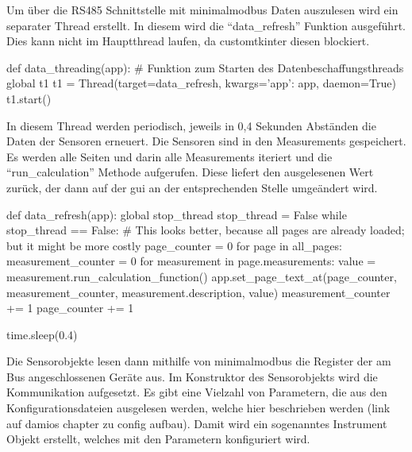 Um über die RS485 Schnittstelle mit minimalmodbus Daten auszulesen wird ein separater Thread erstellt. In diesem wird die \enquote{data\_refresh} Funktion ausgeführt. Dies kann nicht im Hauptthread laufen, da customtkinter diesen blockiert.

\begin{pythoncode}
def data_threading(app):
	# Funktion zum Starten des Datenbeschaffungsthreads
	global t1
	t1 = Thread(target=data_refresh, kwargs={'app': app}, daemon=True)
	t1.start()
\end{pythoncode}

In diesem Thread werden periodisch, jeweils in 0,4 Sekunden Abständen die Daten der Sensoren erneuert. Die Sensoren sind in den Measurements gespeichert. Es werden alle Seiten und darin alle Measurements iteriert und die \enquote{run\_calculation} Methode aufgerufen. Diese liefert den ausgelesenen Wert zurück, der dann auf der \acs{gui} an der entsprechenden Stelle umgeändert wird.

\begin{pythoncode}
def data_refresh(app):
	global stop_thread
	stop_thread = False
	while stop_thread == False:
		# This looks better, because all pages are already loaded; but it might be more costly
		page_counter = 0
		for page in all_pages:
			measurement_counter = 0
			for measurement in page.measurements:
				value = measurement.run_calculation_function()
				app.set_page_text_at(page_counter, measurement_counter, measurement.description, value)
				measurement_counter += 1
			page_counter += 1
		
		time.sleep(0.4)
\end{pythoncode}

Die Sensorobjekte lesen dann mithilfe von minimalmodbus die Register der am Bus angeschlossenen Geräte aus. Im Konstruktor des Sensorobjekts wird die Kommunikation aufgesetzt. Es gibt eine Vielzahl von Parametern, die aus den Konfigurationsdateien ausgelesen werden, welche hier beschrieben werden (link auf damios chapter zu config aufbau). Damit wird ein sogenanntes Instrument Objekt erstellt, welches mit den Parametern konfiguriert wird.

